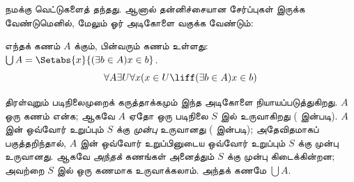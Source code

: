 \documentclass[../../../include/open-logic-section]{subfiles}
\begin{document}

 நமக்கு வெட்டுகளைத் தந்தது.
ஆனால் தன்னிச்சையான சேர்ப்புகள் இருக்க வேண்டுமெனில், மேலும் ஓர் அடிகோளை
வகுக்க வேண்டும்:

\begin{axiom}[சேர்ப்பு] எந்தக் கணம் $A$ க்கும், பின்வரும் கணம் உள்ளது:
$\bigcup A = \Setabs{x}{(\exists b \in A) x \in b}$.
\[
	\forall A \exists U \forall x(x \in U \liff (\exists b \in A)x \in b)
\]
\end{axiom}

திரள்வுறும் படிநிலைமுறைக் கருத்தாக்கமும் இந்த அடிகோளை நியாயப்படுத்துகிறது.
$A$ ஒரு கணம் என்க; ஆகவே $A$ ஏதோ ஒரு படிநிலை $S$ இல் உருவாகிறது
(\stageshier{} இன்படி). $A$ இன் ஒவ்வோர் உறுப்பும் $S$ க்கு \emph{முன்பு}
உருவானது (\stagesacc{} இன்படி); அதேவிதமாகப் பகுத்தறிந்தால், $A$ இன்
ஒவ்வோர் உறுப்பினுடைய ஒவ்வோர் உறுப்பும் $S$ க்கு முன்பு உருவானது. ஆகவே
\emph{அந்தக்} கணங்கள் அனைத்தும் $S$ க்கு முன்பு கிடைக்கின்றன; அவற்றை
$S$ இல் ஒரு கணமாக உருவாக்கலாம். அந்தக் கணமே $\bigcup A$.
\end{document}
